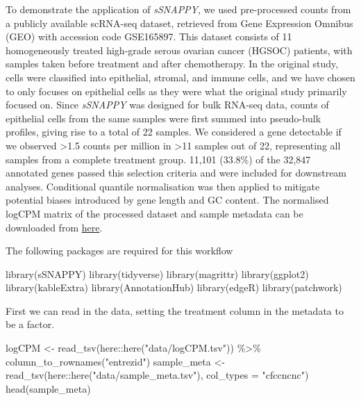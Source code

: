 \documentclass[9pt,a4paper,]{extarticle}
\newenvironment{Shaded}{\begin{snugshade}}{\end{snugshade}}
\newcommand{\AttributeTok}[1]{\textcolor[rgb]{0.77,0.63,0.00}{#1}}
\newcommand{\FunctionTok}[1]{\textcolor[rgb]{0.00,0.00,0.00}{#1}}
\newcommand{\NormalTok}[1]{#1}
\newcommand{\OtherTok}[1]{\textcolor[rgb]{0.56,0.35,0.01}{#1}}
\newcommand{\SpecialCharTok}[1]{\textcolor[rgb]{0.00,0.00,0.00}{#1}}
\newcommand{\StringTok}[1]{\textcolor[rgb]{0.31,0.60,0.02}{#1}}
\begin{document}
To demonstrate the application of \emph{sSNAPPY}, we used pre-processed counts from a publicly available scRNA-seq dataset, retrieved from Gene Expression Omnibus (GEO) with accession code GSE165897.
This dataset consists of 11 homogeneously treated high-grade serous ovarian cancer (HGSOC) patients, with samples taken before treatment and after chemotherapy\citep{Zhang2022}.
In the original study, cells were classified into epithelial, stromal, and immune cells, and we have chosen to only focuses on epithelial cells as they were what the original study primarily focused on.
Since \emph{sSNAPPY} was designed for bulk RNA-seq data, counts of epithelial cells from the same samples were first summed into pseudo-bulk profiles, giving rise to a total of 22 samples.
We considered a gene detectable if we observed \textgreater1.5 counts per million in \textgreater11 samples out of 22, representing all samples from a complete treatment group.
11,101 (33.8\%) of the 32,847 annotated genes passed this selection criteria and were included for downstream analyses.
Conditional quantile normalisation\citep{Hansen2012} was then applied to mitigate potential biases introduced by gene length and GC content.
The normalised logCPM matrix of the processed dataset and sample metadata can be downloaded from \href{https://github.com/Wenjun-Liu/F1000_sSNAPPY_manuscript/tree/master/data}{here}.

The following packages are required for this workflow

\begin{Shaded}
\begin{Highlighting}[]
\FunctionTok{library}\NormalTok{(sSNAPPY)}
\FunctionTok{library}\NormalTok{(tidyverse)}
\FunctionTok{library}\NormalTok{(magrittr)}
\FunctionTok{library}\NormalTok{(ggplot2)}
\FunctionTok{library}\NormalTok{(kableExtra)}
\FunctionTok{library}\NormalTok{(AnnotationHub) }
\FunctionTok{library}\NormalTok{(edgeR)}
\FunctionTok{library}\NormalTok{(patchwork)}
\end{Highlighting}
\end{Shaded}

First we can read in the data, setting the treatment column in the metadata to be a factor.

\begin{Shaded}
\begin{Highlighting}[]
\NormalTok{logCPM }\OtherTok{\textless{}{-}} \FunctionTok{read\_tsv}\NormalTok{(here}\SpecialCharTok{::}\FunctionTok{here}\NormalTok{(}\StringTok{"data/logCPM.tsv"}\NormalTok{)) }\SpecialCharTok{\%\textgreater{}\%}
    \FunctionTok{column\_to\_rownames}\NormalTok{(}\StringTok{"entrezid"}\NormalTok{)}
\NormalTok{sample\_meta }\OtherTok{\textless{}{-}} \FunctionTok{read\_tsv}\NormalTok{(here}\SpecialCharTok{::}\FunctionTok{here}\NormalTok{(}\StringTok{"data/sample\_meta.tsv"}\NormalTok{), }\AttributeTok{col\_types =} \StringTok{"cfccncnc"}\NormalTok{)}
\FunctionTok{head}\NormalTok{(sample\_meta)}
\end{Highlighting}
\end{Shaded}
\end{document}
